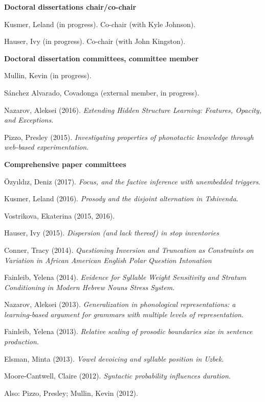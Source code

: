 \documentclass[10pt]{article}
\newcommand{\halfblankline}{\quad\vspace{-0.5\baselineskip}\pagebreak[3]}
\begin{document}
\textbf{Doctoral dissertations chair/co-chair} \hfill 

\begin{innerlist}
    \item Kusmer, Leland (in progress). Co-chair (with Kyle Johnson).
    \item Hauser, Ivy (in progress). Co-chair (with John Kingston).
\end{innerlist}

\halfblankline

\textbf{Doctoral dissertation committees, committee member} \hfill 

\begin{innerlist}
    \item Mullin, Kevin (in progress).
    \item S\'anchez Alvarado, Covadonga (external member, in progress).
    \item Nazarov, Aleksei (2016). \emph{Extending Hidden Structure Learning: Features, Opacity, and Exceptions}.
    \item Pizzo, Presley (2015). \emph{Investigating properties of
        phonotactic knowledge through web-based experimentation}.
\end{innerlist}

\halfblankline

\textbf{Comprehensive paper committees} \hfill 

\begin{innerlist}
  \item \"{O}zy\i{}ld\i{}z, Deniz (2017). \emph{Focus, and the factive inference with unembedded triggers}.
    \item Kusmer, Leland (2016). \emph{Prosody and the disjoint alternation in Tshivenda}. 
    \item Vostrikova, Ekaterina (2015, 2016). 
    \item Hauser, Ivy (2015). \emph{Dispersion (and lack thereof) in stop inventories}
    \item Conner, Tracy (2014). \emph{Questioning Inversion and
        Truncation as Constraints on Variation in African American English Polar Question Intonation}
    \item Fainleib, Yelena (2014). \emph{Evidence for Syllable Weight Sensitivity and Stratum Conditioning in Modern Hebrew Nouns Stress System.}
    \item Nazarov, Aleksei (2013). \emph{Generalization in phonological representations: a learning-based argument for grammars with multiple levels of representation}.
    \item Fainleib, Yelena (2013). \emph{Relative scaling of prosodic boundaries size in sentence production}. 
    \item Elsman, Minta (2013). \emph{Vowel devoicing and syllable position in Uzbek}.
    \item Moore-Cantwell, Claire (2012). \emph{Syntactic probability
        influences duration}.
    \item Also: Pizzo, Presley; Mullin, Kevin (2012).
\end{innerlist}
\end{document}
